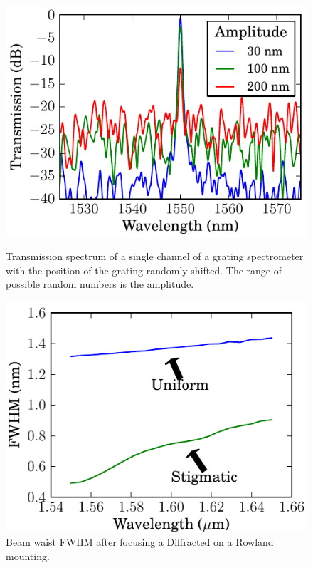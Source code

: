 \documentclass[12pt,twoside,english]{book}
\renewcommand{\~}{\perispomeni}%
\numberwithin{equation}{section}
\numberwithin{figure}{section}
\begin{document}
\begin{figure}[h]
    \begin{minipage}[t]{0.48\textwidth}
    \includegraphics{random-offline-test.pdf}
    \caption{Transmission spectrum of a single channel of a grating spectrometer with the position of the grating randomly shifted. The range of possible random numbers is the amplitude.}
    \label{fig:defect simulation}
    \end{minipage}
    \hfill
    \begin{minipage}[t]{0.48\textwidth}
    \includegraphics{graphs/aberrationComp.pdf}
    \caption{Beam waist FWHM after focusing a Diffracted on a Rowland mounting.\label{fig:stigmatic comparison graph}}
    \end{minipage}
\end{figure}
\end{document}
